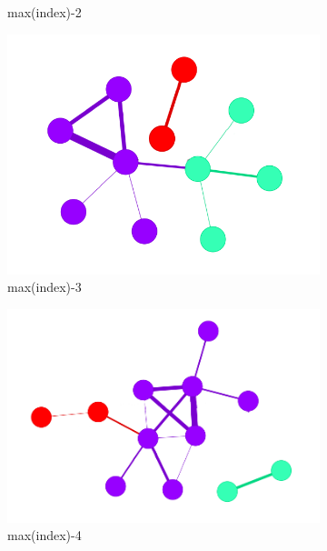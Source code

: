 \begin{figure}[!htb]
\begin{subfigure}[b]{0.15\linewidth}
		\caption{max(index)-2}
	\end{subfigure}
	\hfill
	\begin{subfigure}[b]{0.15\linewidth}
		\includegraphics[width=\linewidth]{Minor Thesis/figures/graphs/nn/D.png}
		\caption{max(index)-3}
	\end{subfigure}
	\hfill
	\begin{subfigure}[b]{0.15\linewidth}
		\includegraphics[width=\linewidth]{Minor Thesis/figures/graphs/nn/E.png}
		\caption{max(index)-4}
	\end{subfigure}
	\hfill
	\begin{subfigure}[b]{0.15\linewidth}

\end{subfigure}
\end{figure}
